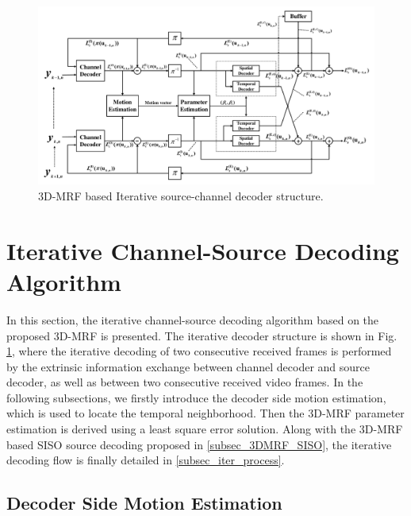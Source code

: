 \documentclass[10pt,twocolumn,twoside]{IEEEtran}
\begin{document}
\begin{figure}[t]
\centering
\includegraphics[width=\textwidth]{block_diagram_test.pdf}
\caption{3D-MRF based Iterative source-channel decoder structure.}
\label{cf_de}
\end{figure}

\section{Iterative Channel-Source Decoding Algorithm}\label{sec_alg}

In this section, the iterative channel-source decoding algorithm based on the proposed 3D-MRF is presented. The iterative decoder structure is shown in Fig. \ref{cf_de}, where the iterative decoding of two consecutive received frames is performed by the extrinsic information exchange between channel decoder and source decoder, as well as between two consecutive received video frames. In the following subsections, we firstly introduce the decoder side motion estimation, which is used to locate the temporal neighborhood. Then the 3D-MRF parameter estimation is derived using a least square error solution. Along with the 3D-MRF based SISO source decoding proposed in \ref{subsec_3DMRF_SISO}, the iterative decoding flow is finally detailed in \ref{subsec_iter_process}.

\subsection{Decoder Side Motion Estimation}
\end{document}
